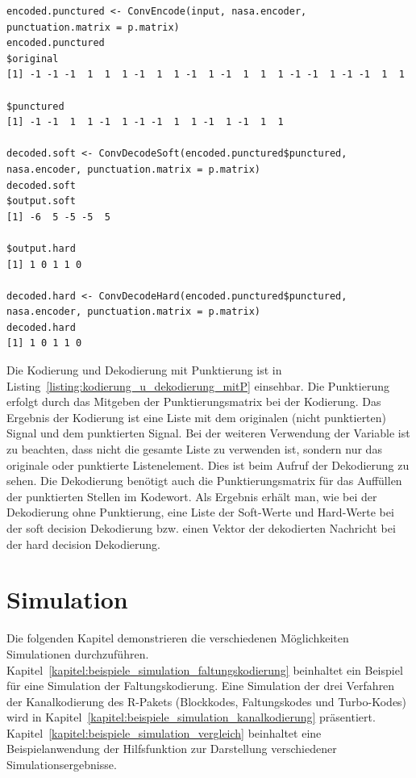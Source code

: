 \begin{lstlisting}[caption=Kodierung und Dekodierung mit Punktierung, label={listing:kodierung_u_dekodierung_mitP}, float=!th]
encoded.punctured <- ConvEncode(input, nasa.encoder, punctuation.matrix = p.matrix)
encoded.punctured
$original
[1] -1 -1 -1  1  1  1 -1  1  1 -1  1 -1  1  1  1 -1 -1  1 -1 -1  1  1

$punctured
[1] -1 -1  1  1 -1  1 -1 -1  1  1 -1  1 -1  1  1

decoded.soft <- ConvDecodeSoft(encoded.punctured$punctured, nasa.encoder, punctuation.matrix = p.matrix)
decoded.soft
$output.soft
[1] -6  5 -5 -5  5

$output.hard
[1] 1 0 1 1 0

decoded.hard <- ConvDecodeHard(encoded.punctured$punctured, nasa.encoder, punctuation.matrix = p.matrix)
decoded.hard
[1] 1 0 1 1 0
\end{lstlisting}

Die Kodierung und Dekodierung mit Punktierung ist in Listing~\ref{listing:kodierung_u_dekodierung_mitP} einsehbar. Die Punktierung erfolgt durch das Mitgeben der Punktierungsmatrix bei der Kodierung. Das Ergebnis der Kodierung ist eine Liste mit dem originalen (nicht punktierten) Signal und dem punktierten Signal. Bei der weiteren Verwendung der Variable ist zu beachten, dass nicht die gesamte Liste zu verwenden ist, sondern nur das originale oder punktierte Listenelement. Dies ist beim Aufruf der Dekodierung zu sehen. Die Dekodierung benötigt auch die Punktierungsmatrix für das Auffüllen der punktierten Stellen im Kodewort. Als Ergebnis erhält man, wie bei der Dekodierung ohne Punktierung, eine Liste der Soft-Werte und Hard-Werte bei der soft decision Dekodierung bzw. einen Vektor der dekodierten Nachricht bei der hard decision Dekodierung.

\section{Simulation}
\label{kapitel:beispiele_simulation}
Die folgenden Kapitel demonstrieren die verschiedenen Möglichkeiten Simulationen durchzuführen. Kapitel~\ref{kapitel:beispiele_simulation_faltungskodierung} beinhaltet ein Beispiel für eine Simulation der Faltungskodierung. Eine Simulation der drei Verfahren der Kanalkodierung des R-Pakets (Blockkodes, Faltungskodes und Turbo-Kodes) wird in Kapitel~\ref{kapitel:beispiele_simulation_kanalkodierung} präsentiert. Kapitel~\ref{kapitel:beispiele_simulation_vergleich} beinhaltet eine Beispielanwendung der Hilfsfunktion zur Darstellung verschiedener Simulationsergebnisse.

